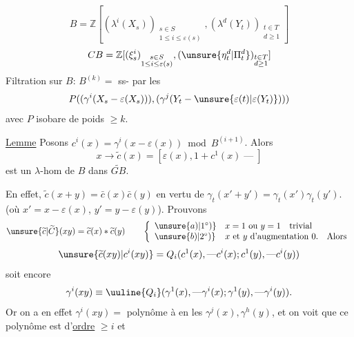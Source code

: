 \[
B=\mathbb Z[(\lambda^i(X_s))_{\substack{s\in S\\1\leq i\leq\varepsilon(s)}},
(\lambda^d(Y_t))_{\substack{t\in T\\d\geq1}}]
\]
\[
CB=\mathbb Z[(\xi_s^i)_{\substack{s\in S\\1\leq i\leq\varepsilon(s)}},
(\unsure{\eta_t^d|\Pi_t^d})_{\substack{t\in T\\d\geq1}}]
\]
Filtration sur $B$:  $B^{(k)}=$ ss- par les
\[
P((\gamma^i(X_s-\varepsilon(X_s))),(\gamma^j(Y_t-\unsure{\varepsilon(t)|\varepsilon(Y_t)})))
\]
avec $P$  isobare de poids $\geq k$.

 \uline{Lemme} Posons $c^i(x)=\gamma^i(x-\varepsilon(x))\bmod B^{(i+1)}$. Alors
\[
x\longrightarrow\widetilde c(x)=[\varepsilon(x),1+c^1(x)\mathbin{\text{---}}]
\]
est un $\lambda$-hom de $B$ dans $\widetilde{GB}$.

En effet, $\widetilde c(x+y)=\bar c(x)\bar c(y)$ en vertu de $\gamma_t(x'+y')=\gamma_t(x')\gamma_t(y')$.
(où $x'=x-\varepsilon(x)$, $y'=y-\varepsilon(y)$). Prouvons
\[
\unsure{\widetilde c|\widetilde C}(xy)=\widetilde c(x)*\widetilde c(y)
\qquad
\left\{\begin{array}{ll}
\unsure{a)|1^\circ)} & x=1\text{ ou }y=1\quad\text{trivial}\\
\unsure{b)|2^\circ)} & x\text{ et }y\text{ d'augmentation }0.\quad\text{Alors}
\end{array}\right.
\]
\[
\unsure{\widetilde c(xy)|c^i(xy)}=Q_i(c^1(x),\mathbin{\text{---}}c^i(x);c^1(y),\mathbin{\text{---}}c^i(y))
\]
soit encore 
\[
\gamma^i(xy)\equiv\uuline{Q_i}(\gamma^1(x),\mathbin{\text{---}}\gamma^i(x);\gamma^1(y),\mathbin{\text{---}}\gamma^i(y)).
\]
Or on a en effet $\gamma^i(xy)=$ polynôme à  en les $\gamma^j(x),\gamma^h(y)$, et on voit  que ce polynôme est d'\uline{ordre} $\geq i$ et 
